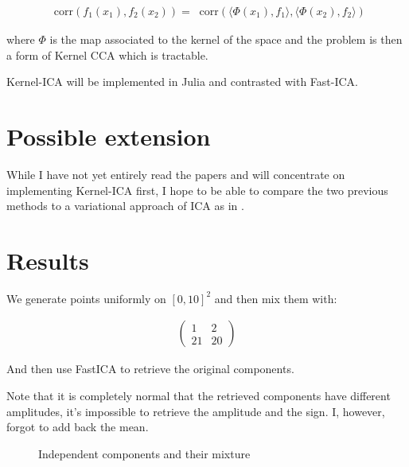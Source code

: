 \documentclass[11pt]{article}
\newcommand*\corr{\mathop{}\!\mathrm{corr}}
\begin{document}
\begin{align*}
	\corr(f_1(x_1), f_2(x_2)) = \corr \left( \langle \Phi (x_1), f_1 \rangle, \langle \Phi (x_2), f_2 \rangle \right)
\end{align*}

where $\Phi$ is the map associated to the kernel of the space and the problem is then a form of Kernel CCA which is tractable.

Kernel-ICA will be implemented in Julia and contrasted with Fast-ICA.

\section{Possible extension}

While I have not yet entirely read the papers and will concentrate on implementing Kernel-ICA first, I hope to be able to compare the two previous methods to a variational approach of ICA as in \cite{Lawrence2000, Winther2007, Choudrey2002}.

\section{Results}

We generate points uniformly on $[0,10]^2$ and then mix them with:

\begin{align*}
	\begin{pmatrix}
		1 & 2 \\ 
		21 & 20
	\end{pmatrix}	
\end{align*}

And then use FastICA to retrieve the original components.

Note that it is completely normal that the retrieved components have different amplitudes, it's impossible to retrieve the amplitude and the sign. I, however, forgot to add back the mean.

\begin{figure}[H]
  \centering
  \hfill
  \caption{Independent components and their mixture}
\end{figure}
\end{document}

